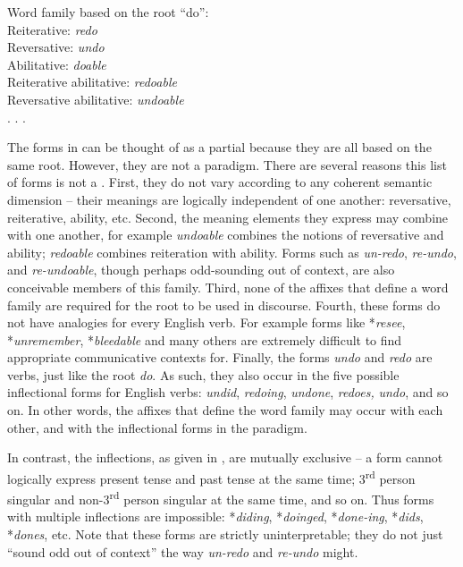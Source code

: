 \ea
\label{bkm:Ref59176157}Word family based on the root “do”: \\
Reiterative:    \textit{redo} \\
Reversative:    \textit{undo} \\
Abilitative:    \textit{doable} \\
Reiterative abilitative:  \textit{redoable} \\
Reversative abilitative:  \textit{undoable} \\
. . .
\z

The forms in  can be thought of as a partial  because they are all based on the same root. However, they are not a paradigm. There are several reasons this list of forms is not a . First, they do not vary according to any coherent semantic dimension – their meanings are logically independent of one another: reversative, reiterative, ability, etc. Second, the meaning elements they express may combine with one another, for example \textit{undoable} combines the notions of reversative and ability; \textit{redoable} combines reiteration with ability. Forms such as \textit{un-redo}, \textit{re-undo}, and \textit{re-undoable}, though perhaps odd-sounding out of context, are also conceivable members of this family. Third, none of the affixes that define a word family are required for the root to be used in discourse. Fourth, these forms do not have analogies for every English verb. For example forms like *\textit{resee}, *\textit{unremember}, *\textit{bleedable} and many others are extremely difficult to find appropriate communicative contexts for. Finally, the forms \textit{undo} and \textit{redo} are verbs, just like the root \textit{do}. As such, they also occur in the five possible inflectional forms for English verbs: \textit{undid}, \textit{redoing}, \textit{undone}, \textit{redoes,} \textit{undo}, and so on. In other words, the affixes that define the word family may occur with each other, and with the inflectional forms in the paradigm.

In contrast, the inflections, as given in , are mutually exclusive – a form cannot logically express present tense and past tense at the same time; 3\textsuperscript{rd} person singular and non-3\textsuperscript{rd} person singular at the same time, and so on. Thus forms with multiple inflections are impossible: *\textit{diding}, *\textit{doinged}, *\textit{done-ing}, *\textit{dids}, *\textit{dones}, etc. Note that these forms are strictly uninterpretable; they do not just “sound odd out of context” the way \textit{un-redo} and \textit{re-undo} might.

